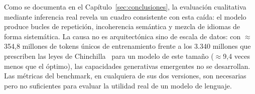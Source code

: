 Como se documenta en el Capítulo~\ref{sec:conclusiones}, la evaluación cualitativa mediante inferencia real revela un cuadro consistente con esta caída: el modelo produce bucles de repetición, incoherencia semántica y mezcla de idiomas de forma sistemática. La causa no es arquitectónica sino de escala de datos: con $\approx$354,8 millones de tokens únicos de entrenamiento frente a los 3.340 millones que prescriben las leyes de Chinchilla~\cite{hoffmann2022chinchilla} para un modelo de este tamaño ($\approx$9,4 veces menos que el óptimo), las capacidades generativas emergentes no se desarrollan. Las métricas del benchmark, en cualquiera de sus dos versiones, son necesarias pero no suficientes para evaluar la utilidad real de un modelo de lenguaje.